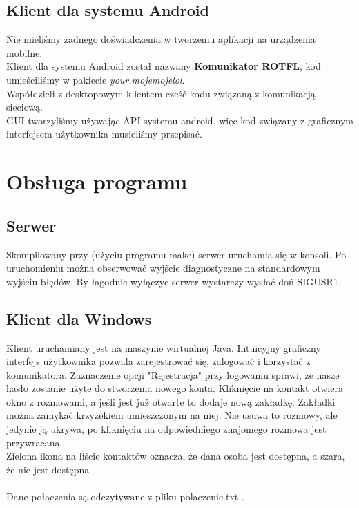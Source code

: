 \documentclass[10pt,a4paper]{article}
\begin{document}
	\subsection{Klient dla systemu Android}
		Nie mieliśmy żadnego doświadczenia w tworzeniu aplikacji na urządzenia mobilne.\\
		Klient dla systemu Android został nazwany \textbf{Komunikator ROTFL}, kod umieściliśmy w pakiecie \textit{your.mojemojelol}.\\
		Współdzieli z desktopowym klientem cześć kodu związaną z komunikacją sieciową.\\
		GUI tworzyliśmy używając API systemu android, więc kod związany z graficznym interfejsem użytkownika musieliśmy  przepisać.
	
\section{Obsługa programu}
	\subsection{Serwer}
		Skompilowany przy (użyciu programu make) serwer uruchamia się w konsoli.
		Po uruchomieniu można obserwować wyjście diagnostyczne na standardowym wyjściu błędów.
		By łagodnie wyłączyc serwer wystarczy wysłać doń SIGUSR1.
	\subsection{Klient dla Windows}
		Klient uruchamiany jest na maszynie wirtualnej Java.
		Intuicyjny graficzny interfejs użytkownika pozwala zarejestrować się, zalogować i korzystać z komunikatora.
		Zaznaczenie opcji "Rejestracja" przy logowaniu sprawi, że nasze hasło zostanie użyte do stworzenia nowego konta.
		Kliknięcie na kontakt otwiera okno z rozmowami, a jeśli jest już otwarte to dodaje nową zakładkę.
		Zakładki można zamykać krzyżekiem umieszczonym na niej. Nie usuwa to rozmowy, ale jedynie ją ukrywa, po kliknięciu
		na odpowiedniego znajomego rozmowa jest przywracana. \\
		Zielona ikona na liście kontaktów oznacza, że dana osoba jest dostępna, a szara, że nie jest dostępna \\ \\
		Dane połączenia są odczytywane z pliku polaczenie.txt .
\end{document}
